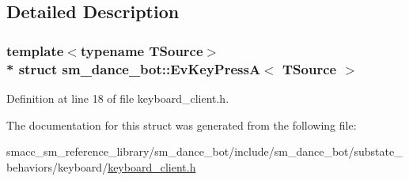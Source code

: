 \subsection{Detailed Description}
\subsubsection*{template$<$typename T\+Source$>$\\*
struct sm\+\_\+dance\+\_\+bot\+::\+Ev\+Key\+Press\+A$<$ T\+Source $>$}



Definition at line 18 of file keyboard\+\_\+client.\+h.



The documentation for this struct was generated from the following file\+:\begin{DoxyCompactItemize}
\item 
smacc\+\_\+sm\+\_\+reference\+\_\+library/sm\+\_\+dance\+\_\+bot/include/sm\+\_\+dance\+\_\+bot/substate\+\_\+behaviors/keyboard/\hyperlink{keyboard__client_8h}{keyboard\+\_\+client.\+h}\end{DoxyCompactItemize}
